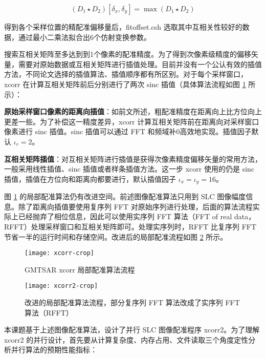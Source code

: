 \begin{equation}
    (D_1 \star D_2)[\delta_x, \delta_y] = \max(D_1 \star D_2)
\end{equation}

得到各个采样位置的精配准偏移量后，fitoffset.csh 选取其中互相关性较好的数据，通过最小二乘法拟合出6个仿射变换参数。

搜索互相关矩阵至多达到到1个像素的配准精度。为了得到次像素级精度的偏移矢量，需要对原始数据或互相关矩阵进行插值处理。目前并没有一个公认有效的插值方法，不同论文选择的插值算法、插值顺序都有所区别\cite{li2008image}\cite{hanssen1999evaluation}。对于每个采样窗口，xcorr 在计算互相关矩阵前后分别进行了两次 sinc 插值（具体算法流程如图 \ref{fig:xcorr} 所示）：

\textbf{原始采样窗口像素的距离向插值}：如前文所述，粗配准精度在距离向上比方位向上更差一些。为了补偿这一精度差异，xcorr 计算互相关矩阵前在距离向对采样窗口像素进行 sinc 插值。sinc 插值可以通过 FFT 和频域补0高效地实现。插值因子默认 $\iota_r = 2$。

\textbf{互相关矩阵插值}：对互相关矩阵进行插值是获得次像素精度偏移矢量的常用方法，一般采用线性插值、sinc 插值或者样条插值方法。这一步 xcorr 使用的仍是 sinc 插值，插值在方位向和距离向都要进行，默认插值因子 $\iota_x = \iota_y = 16$。

图 \ref{fig:xcorr} 的局部配准算法仍有改进空间。前述图像配准算法只用到 SLC 图像幅度信息。除了距离向插值要使用复序列 FFT 对原始序列进行处理，后面的算法流程实际上已经抛弃了相位信息，因此可以使用实序列 FFT 算法（FFT of real data，RFFT）处理采样窗口和互相关矩阵即可。处理实序列时，RFFT 比复序列 FFT 节省一半的运行时间和存储空间。改进后的局部配准流程如图 \ref{fig:xcorr2} 所示。

\begin{figure}[htbp]
\centering
\texttt{[image: xcorr-crop]}
\caption{GMTSAR xcorr 局部配准算法流程} \label{fig:xcorr}
\end{figure}

\begin{figure}[htbp]
\centering
\texttt{[image: xcorr2-crop]}
\caption{改进的局部配准算法流程，部分复序列 FFT 算法改成了实序列 FFT 算法（RFFT）} \label{fig:xcorr2}
\end{figure}

本课题基于上述图像配准算法，设计了并行 SLC 图像配准程序 xcorr2。为了理解 xcorr2 的并行设计，首先要从计算复杂度、内存占用、文件读取三个角度定性分析并行算法的预期性能指标：

